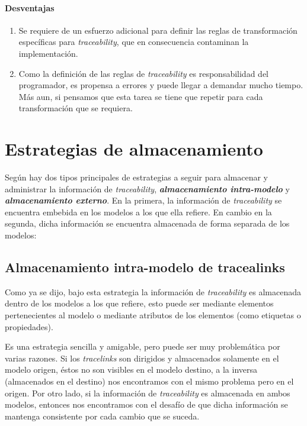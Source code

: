 \documentclass[a4paper,12pt,oneside,spanish]{book}
\begin{document}
\paragraph{Desventajas}

\begin{enumerate}

\item Se requiere de un esfuerzo adicional para definir las reglas de transformación específicas para \textit{traceability}, que en consecuencia contaminan la implementación.

\item Como la definición de las reglas de \textit{traceability} es responsabilidad del programador, es propensa a errores y puede llegar a demandar mucho tiempo. Más aun, si pensamos que esta tarea se tiene que repetir para cada transformación que se requiera.

\end{enumerate}


\section{Estrategias de almacenamiento}

Según \cite{DrivalosPaigeFernandesKolovos} hay dos tipos principales de estrategias a seguir para almacenar y administrar la información de \textit{traceability}, \textit{\textbf{almacenamiento intra-modelo}} y \textit{\textbf{almacenamiento externo}}. En la primera, la información de \textit{traceability} se encuentra embebida en los modelos a los que ella refiere. En cambio en la segunda, dicha información se encuentra almacenada de forma separada de los modelos:

\subsection{Almacenamiento intra-modelo de tracealinks}

Como ya se dijo, bajo esta estrategia la información de \textit{traceability} es almacenada dentro de los modelos a los que refiere, esto puede ser mediante elementos pertenecientes al modelo o mediante atributos de los elementos (como etiquetas o propiedades).

Es una estrategia sencilla y amigable, pero puede ser muy problemática por varias razones. Si los \textit{tracelinks} son dirigidos y almacenados solamente en el modelo origen, éstos no son visibles en el modelo destino, a la inversa (almacenados en el destino) nos encontramos con el mismo problema pero en el origen. Por otro lado, si la información de \textit{traceability} es almacenada en ambos modelos, entonces nos encontramos con el desafío de que dicha información se mantenga consistente por cada cambio que se suceda.
\end{document}
